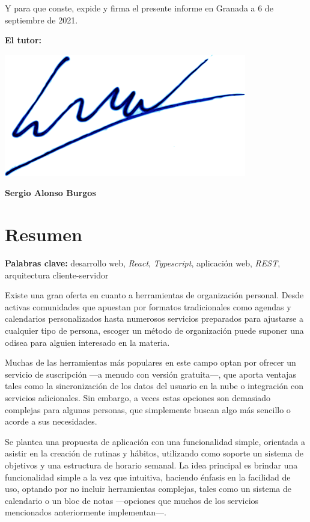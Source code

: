 \documentclass[10pt, a4paper]{aqademic}
\begin{document}
\bigskip

Y para que conste, expide y firma el presente informe en Granada a 6 de septiembre de 2021.

\bigskip

\textbf{\large{El tutor:}}

\vspace{4cm}

\includegraphics[scale=0.12]{img/firmaZerjillo.png}

\textbf{Sergio Alonso Burgos}

\newpage

\section*{Resumen}
\textbf{Palabras clave:} desarrollo web, \textit{React}, \textit{Typescript}, aplicación web, \textit{REST}, arquitectura cliente-servidor

\bigskip

Existe una gran oferta en cuanto a herramientas de organización personal. Desde activas comunidades que apuestan por formatos tradicionales como agendas y calendarios personalizados hasta numerosos servicios preparados para ajustarse a cualquier tipo de persona, escoger un método de organización puede suponer una odisea para alguien interesado en la materia. 

\medskip

Muchas de las herramientas más populares en este campo optan por ofrecer un servicio de suscripción ---a menudo con versión gratuita---, que aporta ventajas tales como la sincronización de los datos del usuario en la nube o integración con servicios adicionales. Sin embargo, a veces estas opciones son demasiado complejas para algunas personas, que simplemente buscan algo más sencillo o acorde a sus necesidades.

\medskip

Se plantea una propuesta de aplicación con una funcionalidad simple, orientada a asistir en la creación de rutinas y hábitos, utilizando como soporte un sistema de objetivos y una estructura de horario semanal. La idea principal es brindar una funcionalidad simple a la vez que intuitiva, haciendo énfasis en la facilidad de uso, optando por no incluir herramientas complejas, tales como un sistema de calendario o un bloc de notas ---opciones que muchos de los servicios mencionados anteriormente implementan---.
\end{document}
